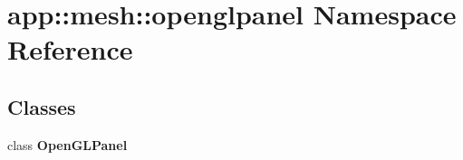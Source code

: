 \section{app::mesh::openglpanel Namespace Reference}
\label{namespaceapp_1_1mesh_1_1openglpanel}


\subsection*{Classes}
\begin{CompactItemize}
\item 
class {\bf OpenGLPanel}
\end{CompactItemize}
